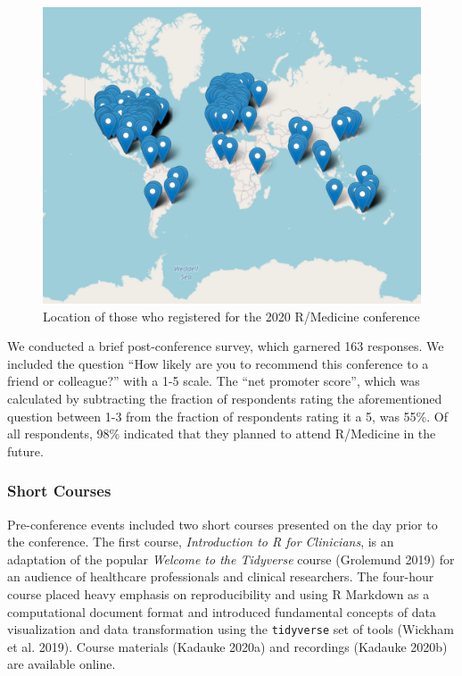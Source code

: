 \begin{figure}

{\centering \includegraphics[width=0.7\linewidth]{Figure} 

}

\caption{Location of those who registered for the 2020 R/Medicine conference}\label{fig:map}
\end{figure}

We conducted a brief post-conference survey, which garnered 163 responses. We included the question ``How likely are you to recommend this conference to a friend or colleague?'' with a 1-5 scale. The ``net promoter score'', which was calculated by subtracting the fraction of respondents rating the aforementioned question between 1-3 from the fraction of respondents rating it a 5, was 55\%. Of all respondents, 98\% indicated that they planned to attend R/Medicine in the future.

\hypertarget{short-courses}{%
\subsubsection{Short Courses}\label{short-courses}}

Pre-conference events included two short courses presented on the day prior to the conference. The first course, \emph{Introduction to R for Clinicians}, is an adaptation of the popular \emph{Welcome to the Tidyverse} course (Grolemund 2019) for an audience of healthcare professionals and clinical researchers. The four-hour course placed heavy emphasis on reproducibility and using R Markdown as a computational document format and introduced fundamental concepts of data visualization and data transformation using the \texttt{tidyverse} set of tools (Wickham et al. 2019). Course materials (Kadauke 2020a) and recordings (Kadauke 2020b) are available online.

